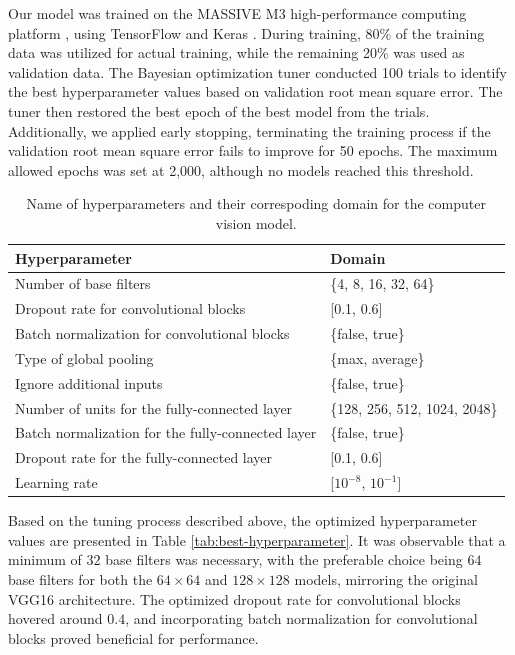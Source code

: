\documentclass[]{interact}
\theoremstyle{plain}%
\theoremstyle{definition}
\theoremstyle{remark}
\begin{document}
Our model was trained on the MASSIVE M3 high-performance computing
platform \citep{goscinski2014multi}, using TensorFlow
\citep{abadi2016tensorflow} and Keras \citep{chollet2015keras}. During
training, 80\% of the training data was utilized for actual training,
while the remaining 20\% was used as validation data. The Bayesian
optimization tuner conducted 100 trials to identify the best
hyperparameter values based on validation root mean square error. The
tuner then restored the best epoch of the best model from the trials.
Additionally, we applied early stopping, terminating the training
process if the validation root mean square error fails to improve for 50
epochs. The maximum allowed epochs was set at 2,000, although no models
reached this threshold.

\begin{table}

\caption{\label{tab:hyperparameter}Name of hyperparameters and their correspoding domain for the computer vision model.}
\centering
\begin{tabular}[t]{ll}
\toprule
Hyperparameter & Domain\\
\midrule
Number of base filters & \{4, 8, 16, 32, 64\}\\
Dropout rate for convolutional blocks & {}[0.1, 0.6]\\
Batch normalization for convolutional blocks & \{false, true\}\\
Type of global pooling & \{max, average\}\\
Ignore additional inputs & \{false, true\}\\
\addlinespace
Number of units for the fully-connected layer & \{128, 256, 512, 1024, 2048\}\\
Batch normalization for the fully-connected layer & \{false, true\}\\
Dropout rate for the fully-connected layer & {}[0.1, 0.6]\\
Learning rate & {}[$10^{-8}$, $10^{-1}$]\\
\bottomrule
\end{tabular}
\end{table}

Based on the tuning process described above, the optimized
hyperparameter values are presented in Table
\ref{tab:best-hyperparameter}. It was observable that a minimum of
\(32\) base filters was necessary, with the preferable choice being
\(64\) base filters for both the \(64 \times 64\) and \(128 \times 128\)
models, mirroring the original VGG16 architecture. The optimized dropout
rate for convolutional blocks hovered around \(0.4\), and incorporating
batch normalization for convolutional blocks proved beneficial for
performance.
\end{document}
